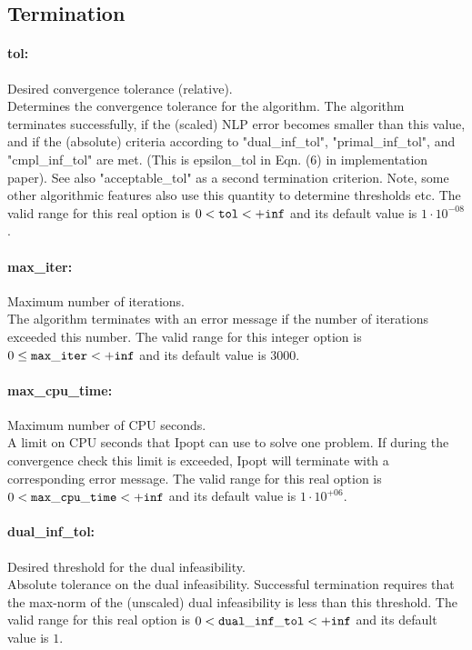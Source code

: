 \subsection{Termination}

\paragraph{tol:}\label{sec:tol} Desired convergence tolerance (relative). $\;$ \\
 Determines the convergence tolerance for the
algorithm.  The algorithm terminates
successfully, if the (scaled) NLP error becomes
smaller than this value, and if the (absolute)
criteria according to "dual\_inf\_tol",
"primal\_inf\_tol", and "cmpl\_inf\_tol" are met.
 (This is epsilon\_tol in Eqn. (6) in
implementation paper).  See also
"acceptable\_tol" as a second termination
criterion.  Note, some other algorithmic features
also use this quantity to determine thresholds
etc. The valid range for this real option is 
$0 <  {\tt tol } <  {\tt +inf}$
and its default value is $1 \cdot 10^{-08}$.


\paragraph{max\_iter:}\label{sec:max_iter} Maximum number of iterations. $\;$ \\
 The algorithm terminates with an error message if
the number of iterations exceeded this number. The valid range for this integer option is
$0 \le {\tt max\_iter } <  {\tt +inf}$
and its default value is $3000$.


\paragraph{max\_cpu\_time:}\label{sec:max_cpu_time} Maximum number of CPU seconds. $\;$ \\
 A limit on CPU seconds that Ipopt can use to
solve one problem.  If during the convergence
check this limit is exceeded, Ipopt will
terminate with a corresponding error message. The valid range for this real option is 
$0 <  {\tt max\_cpu\_time } <  {\tt +inf}$
and its default value is $1 \cdot 10^{+06}$.


\paragraph{dual\_inf\_tol:}\label{sec:dual_inf_tol} Desired threshold for the dual infeasibility. $\;$ \\
 Absolute tolerance on the dual infeasibility.
Successful termination requires that the max-norm
of the (unscaled) dual infeasibility is less than
this threshold. The valid range for this real option is 
$0 <  {\tt dual\_inf\_tol } <  {\tt +inf}$
and its default value is $1$.


